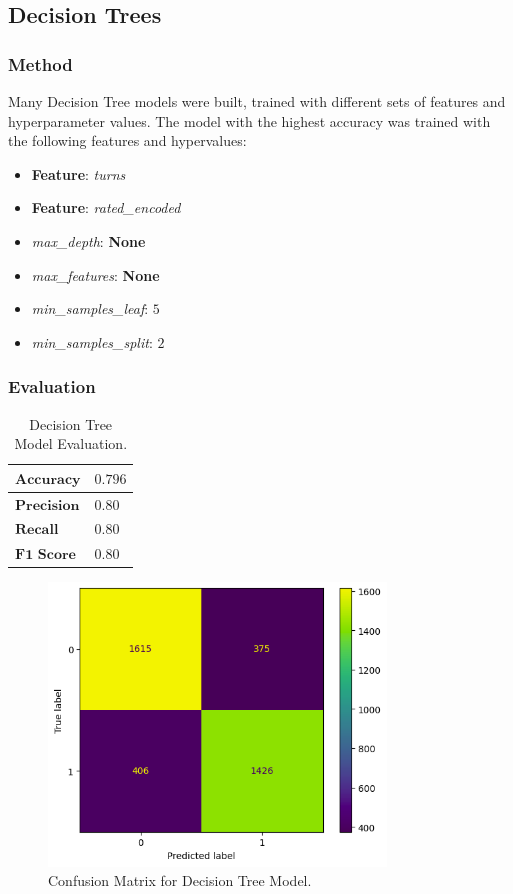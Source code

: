\documentclass[12pt]{article}
\begin{document}
\subsection{Decision Trees}

\subsubsection{Method}
Many Decision Tree models were built, trained with different sets of features and hyperparameter values. The model with the highest accuracy was trained with the following features and hypervalues:

\begin{itemize}
  \item\textbf{Feature}: \textit{turns}
  \item\textbf{Feature}: \textit{rated\_encoded}
  \item\textit{max\_depth}: \textbf{None}
  \item\textit{max\_features}: \textbf{None}
  \item\textit{min\_samples\_leaf}: \textbf{$5$}
  \item\textit{min\_samples\_split}: \textbf{$2$}
\end{itemize}

\subsubsection{Evaluation}

\begin{table}[H]
\centering
\begin{tabular}{|l|l|}
\hline
$\textbf{Accuracy}$ & $0.796$ \\ \hline
$\textbf{Precision}$ & $0.80$ \\ \hline
$\textbf{Recall}$ & $0.80$ \\ \hline
$\textbf{F1 Score}$ & $0.80$ \\ \hline
\end{tabular}
\caption{Decision Tree Model Evaluation.}
\label{tab:dt-eval}
\end{table}

\begin{figure}[H]
\centering
\includegraphics[width=0.8\textwidth]{conf-matrix-dt.png}
\caption{Confusion Matrix for Decision Tree Model.}
\label{fig:conf-matrix-dt}
\end{figure}
\end{document}
